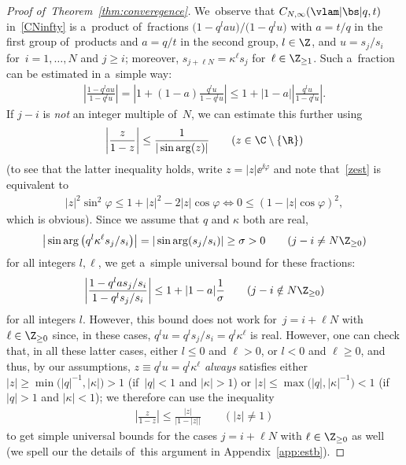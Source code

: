 \begin{proof}[Proof of~Theorem~\ref{thm:converegence}]
We~observe that $C_{N,\infty}(\vlam|\bs|q,t)$ in~\eqref{CNinfty} is a~product of~fractions $\big(1-q^{l}au\big)/\big(1-q^l u\big)$ with $a=t/q$ in the first group of~products and $a=q/t$ in the second group,
 $l\in\Z$, and $u=s_j/s_i$ for~$i=1,\dots,N$ and $j\geq i$; moreover, $s_{j+\ell N}=\kappa^\ell s_j$ for~$\ell\in\Z_{\geq 1}$.
Such a~fraction can be estimated in a~simple way:
\begin{gather*}
\left|\frac{1-q^{l}au}{1-q^l u}\right| = \left|1+(1-a)\frac{q^l u}{1-q^l u} \right|\leq 1+|1-a|\left|\frac{q^l u}{1-q^l u}\right|\!.
\end{gather*}
If $j-i$ is {\em not} an integer multiple of~$N$, we can estimate this further using
\begin{gather}
\label{zest}
\left| \frac{z}{1-z}\right| \leq \frac1{|\sin\arg(z)|} \qquad (z\in\C\setminus\{\R\})
\end{gather}
(to see that the latter inequality holds, write $z=|z|\ee^{\ii\varphi}$ and note that~\eqref{zest} is equivalent to
\begin{gather*}
|z|^2\sin^2\varphi \leq 1+|z|^2-2|z|\cos\varphi\Leftrightarrow 0\leq (1-|z|\cos\varphi)^2,
\end{gather*}
which is obvious). Since we assume that $q$ and $\kappa$ both are real,
\begin{gather*}
\big|\sin\arg\big(q^l \kappa^{\ell }s_j/s_i\big)\big| = |\sin\arg(s_j/s_i)| \geq \sigma>0\qquad (j-i\neq N\Z_{\geq 0})
\end{gather*}
for all integers $l,\ell$, we get a~simple universal bound for these fractions:
\begin{gather*}
\left|\frac{1-q^l a s_j/s_i}{1-q^l s_j/s_i}\right| \leq 1+|1-a|\frac{1}{\sigma} \qquad (j-i \notin N\Z_{\geq 0})
\end{gather*}
for all integers $l$. However, this bound does not work for~$j=i+\ell N$ with $\ell\in\Z_{\geq 0}$ since, in these cases, $q^l u=q^l s_j/s_i=q^l \kappa^\ell$ is real.
However, one can check that, in all these latter cases, either $l\leq 0$ and $\ell>0$, or $l<0$ and $\ell\geq 0$, and thus, by our assumptions, $z\equiv q^lu=q^l \kappa^\ell$ {\em always}
satisfies either $|z|\geq \min\big(|q|^{-1},|\kappa|\big)>1$ (if~$|q|<1$ and $|\kappa|>1$) or $|z|\leq \max\big(|q|,|\kappa|^{-1}\big)<1$ (if~$|q|>1$ and $|\kappa|<1$); we therefore can use the inequality
\begin{gather*}
\left| \frac{z}{1-z}\right| \leq \frac{|z|}{|1-|z||} \qquad (|z|\neq 1)
\end{gather*}
to get simple universal bounds for the cases $j=i+\ell N$ with $\ell\in\Z_{\geq 0}$ as well (we spell our the details of~this argument in Appendix~\ref{app:estb}).

\end{proof}
